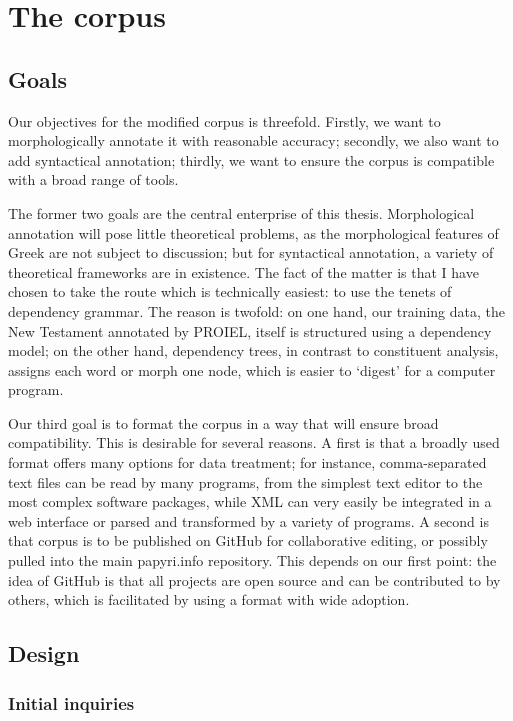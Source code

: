 \chapter{The corpus}
\label{chp:design}
\minitoc\mtcskip
\section{Goals}

Our objectives for the modified corpus is threefold. Firstly, we want to
morphologically annotate it with reasonable accuracy; secondly, we also want to
add syntactical annotation; thirdly, we want to ensure the corpus is compatible
with a broad range of tools.

The former two goals are the central enterprise of this thesis. Morphological
annotation will pose little theoretical problems, as the morphological features
of Greek are not subject to discussion; but for syntactical annotation, a
variety of theoretical frameworks are in existence. The fact of the matter is
that I have chosen to take the route which is technically easiest: to use the
tenets of dependency grammar. The reason is twofold: on one hand, our training
data, the New Testament annotated by PROIEL, itself is structured using a
dependency model; on the other hand, dependency trees, in contrast to
constituent analysis, assigns each word or morph one node, which is easier to
`digest' for a computer program.

Our third goal is to format the corpus in a way that will ensure broad
compatibility. This is desirable for several reasons. A first is that a broadly
used format offers many options for data treatment; for instance,
comma-separated text files can be read by many programs, from the simplest text
editor to the most complex software packages, while XML can very easily be
integrated in a web interface or parsed and transformed by a variety of
programs. A second is that corpus is to be published on GitHub for
collaborative editing, or possibly pulled into the main papyri.info repository.
This depends on our first point: the idea of GitHub is that all projects are
open source and can be contributed to by others, which is facilitated by using a
format with wide adoption.

\section{Design}
\subsection{Initial inquiries}


